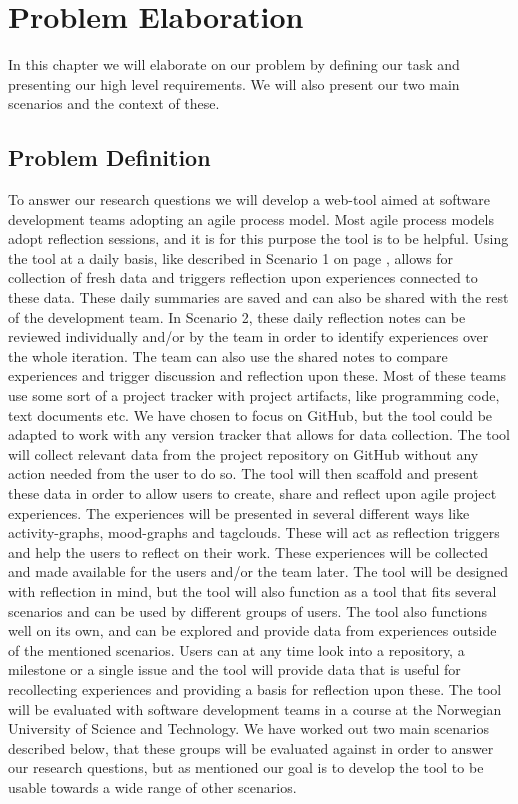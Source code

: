 \chapter{Problem Elaboration}
\label{problemelaboration}
In this chapter we will elaborate on our problem by defining our task and presenting our high level requirements.
We will also present our two main scenarios and the context of these. 

\section{Problem Definition}
\label{problemdefinition}

To answer our research questions we will develop a web-tool aimed at software development teams adopting an agile process model. Most agile process models adopt reflection sessions, and it is for this purpose the tool is to be helpful. Using the tool at a daily basis, like described in Scenario 1 on page \pageref{scenario1}, allows for collection of fresh data and triggers reflection upon experiences connected to these data. These daily summaries are saved and can also be shared with the rest of the development team. In Scenario 2, these daily reflection notes can be reviewed individually and/or by the team in order to identify experiences over the whole iteration. The team can also use the shared notes to compare experiences and trigger discussion and reflection upon these. 
Most of these teams use some sort of a project tracker with project artifacts, like programming code, text documents etc. We have chosen to focus on GitHub, but the tool could be adapted to work with any version tracker that allows for data collection. The tool will collect relevant data from the project repository on GitHub without any action needed from the user to do so. The tool will then scaffold and present these data in order to allow users to create, share and reflect upon agile project experiences.
The experiences will be presented in several different ways like activity-graphs, mood-graphs and tagclouds. These will act as reflection triggers and help the users to reflect on their work. These experiences will be collected and made available for the users and/or the team later. The tool will be designed with reflection in mind, but the tool will also function as 
a tool that fits several scenarios and can be used by different groups of users. The tool also functions well on its own, and can be explored and provide data from experiences outside of the mentioned scenarios. Users can at any time look into a repository, a milestone or a single issue and the tool will provide data that is useful for recollecting experiences and providing a basis for reflection upon these. 
The tool will be evaluated with software development teams in a course at the Norwegian University of Science and Technology. We have worked out two main scenarios described below, that these groups will be evaluated against in order to answer our research questions, but as mentioned our goal is to develop the tool to be usable towards a wide range of other scenarios. 

